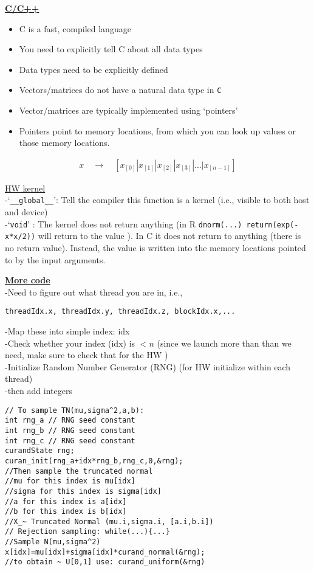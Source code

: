 \documentclass[a4paper, 11pt]{report}
\begin{document}
\bigskip

\underline{\bf {C/C++}} \normalsize \\
\begin{itemize}
\item C is a fast, compiled language 
\item You need to explicitly tell C about all data types
 \item Data types need to be explicitly defined
\item Vectors/matrices do not have a natural data type in \texttt{C}
 \item Vector/matrices are typically implemented using \lq{}pointers\rq{}
\item Pointers point to memory locations, from which you can look up values or those memory locations.
\end{itemize}
\begin{equation}
\begin{aligned}
x \quad \rightarrow \quad [x_{[0]}|x_{[1]}|x_{[2]}|x_{[3]}|...|x_{[n-1]}]
\end{aligned} \nonumber
\end{equation}

\underline{HW kernel}\\
-\lq{}\texttt{\_\_global\_\_}\rq: Tell the compiler this function is a kernel (i.e., visible to both host and device)\\
-\lq{}\texttt{void}\rq{} : The kernel does not return anything (in R \texttt{dnorm(...) return(exp(-x*x/2))} will return to the value ). In C it does not return to anything (there is no return value). Instead, the value is written into the memory locations pointed to by the input arguments. 

\bigskip

\bigskip

\underline{{\bf More code}}\\
-Need to figure out what thread you are in, i.e., 
\begin{verbatim}
threadIdx.x, threadIdx.y, threadIdx.z, blockIdx.x,...
\end{verbatim}
-Map these into simple index: idx\\
-Check whether your index (idx) is $<n$ (since we launch more than than we need, make sure to check that for the HW )\\
-Initialize Random Number Generator (RNG) (for HW initialize within each thread)\\
-then add integers\\
\begin{verbatim}
// To sample TN(mu,sigma^2,a,b):
int rng_a // RNG seed constant
int rng_b // RNG seed constant
int rng_c // RNG seed constant
curandState rng;
curan_init(rng_a+idx*rng_b,rng_c,0,&rng);
//Then sample the truncated normal
//mu for this index is mu[idx]
//sigma for this index is sigma[idx]
//a for this index is a[idx]
//b for this index is b[idx]
//X_~ Truncated Normal (mu.i,sigma.i, [a.i,b.i])
// Rejection sampling: while(...){...}
//Sample N(mu,sigma^2)
x[idx]=mu[idx]+sigma[idx]*curand_normal(&rng);
//to obtain ~ U[0,1] use: curand_uniform(&rng)
\end{verbatim}
\end{document}
